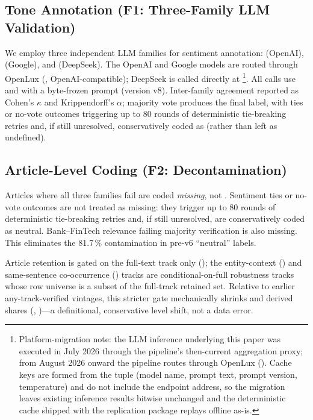 \subsection{Tone Annotation (F1: Three-Family LLM Validation)}
We employ three independent LLM families for sentiment annotation:
 (OpenAI), 
(Google), and  (DeepSeek). The OpenAI and
Google models are routed through OpenLux (,
OpenAI-compatible); DeepSeek is called directly at
\footnote{Platform-migration note: the LLM inference underlying this
paper was executed in July 2026 through the pipeline's then-current
aggregation proxy; from August 2026 onward the pipeline routes through
OpenLux (). Cache keys are formed from
the tuple (model name, prompt text, prompt version, temperature) and do
not include the endpoint address, so the migration leaves existing
inference results bitwise unchanged and the deterministic cache shipped
with the replication package replays offline as-is.}. All calls use  and
 with a byte-frozen prompt (version v8). Inter-family agreement reported as
Cohen's $\kappa$ and Krippendorff's $\alpha$; majority vote produces the
final label, with ties or no-vote outcomes triggering up to 80 rounds of
deterministic tie-breaking retries and, if still unresolved, conservatively
coded as  (rather than left as undefined).

\subsection{Article-Level Coding (F2: Decontamination)}
Articles where all three families fail are coded \emph{missing}, not
. Sentiment ties or no-vote outcomes are not treated as
missing: they trigger up to 80 rounds of deterministic tie-breaking
retries and, if still unresolved, are conservatively coded as neutral.
Bank--FinTech relevance failing majority verification is also missing.
This eliminates the 81.7\,\%
contamination in pre-v6 ``neutral'' labels.

Article retention is gated on the full-text track only
(); the entity-context () and
same-sentence co-occurrence () tracks are conditional-on-full
robustness tracks whose row universe is a subset of the full-track
retained set. Relative to earlier any-track-verified vintages, this
stricter gate mechanically shrinks  and derived
shares (, )---a
definitional, conservative level shift, not a data error.

